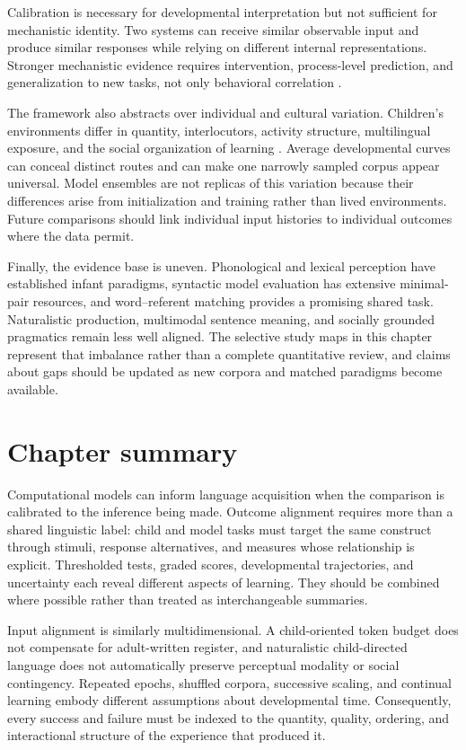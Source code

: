 Calibration is necessary for developmental interpretation but not sufficient for mechanistic identity. Two systems can receive similar observable input and produce similar responses while relying on different internal representations. Stronger mechanistic evidence requires intervention, process-level prediction, and generalization to new tasks, not only behavioral correlation \citep{Marr1982,Perfors2011}.

The framework also abstracts over individual and cultural variation. Children's environments differ in quantity, interlocutors, activity structure, multilingual exposure, and the social organization of learning \citep{WeislederFernald2013,bergelson2023everyday}. Average developmental curves can conceal distinct routes and can make one narrowly sampled corpus appear universal. Model ensembles are not replicas of this variation because their differences arise from initialization and training rather than lived environments. Future comparisons should link individual input histories to individual outcomes where the data permit.

Finally, the evidence base is uneven. Phonological and lexical perception have established infant paradigms, syntactic model evaluation has extensive minimal-pair resources, and word--referent matching provides a promising shared task. Naturalistic production, multimodal sentence meaning, and socially grounded pragmatics remain less well aligned. The selective study maps in this chapter represent that imbalance rather than a complete quantitative review, and claims about gaps should be updated as new corpora and matched paradigms become available.


\section{Chapter summary}
\label{sec:litreview:summary}

Computational models can inform language acquisition when the comparison is calibrated to the inference being made. Outcome alignment requires more than a shared linguistic label: child and model tasks must target the same construct through stimuli, response alternatives, and measures whose relationship is explicit. Thresholded tests, graded scores, developmental trajectories, and uncertainty each reveal different aspects of learning. They should be combined where possible rather than treated as interchangeable summaries.

Input alignment is similarly multidimensional. A child-oriented token budget does not compensate for adult-written register, and naturalistic child-directed language does not automatically preserve perceptual modality or social contingency. Repeated epochs, shuffled corpora, successive scaling, and continual learning embody different assumptions about developmental time. Consequently, every success and failure must be indexed to the quantity, quality, ordering, and interactional structure of the experience that produced it.

